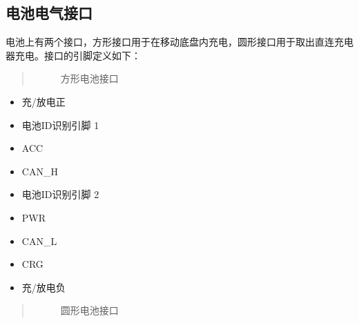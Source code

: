 \documentclass[a4paper,11pt,english,openany,oneside]{sphinxmanual}
\begin{document}
\subsection{电池电气接口}
\label{\detokenize{08 _u5b89_u88c5_u4e0e_u8c03_u8bd5:id17}}\label{\detokenize{08 _u5b89_u88c5_u4e0e_u8c03_u8bd5:id18}}
\sphinxAtStartPar
电池上有两个接口，方形接口用于在移动底盘内充电，圆形接口用于取出直连充电器充电。接口的引脚定义如下：
\begin{quote}

\begin{figure}[H]
\centering
\capstart

\noindent{}
\caption{方形电池接口}\label{\detokenize{08 _u5b89_u88c5_u4e0e_u8c03_u8bd5:id51}}\end{figure}
\end{quote}
\begin{itemize}
\item {} 
 充/放电正

\item {} 
 电池ID识别引脚 1

\item {} 
 ACC

\item {} 
 CAN\_H

\item {} 
 电池ID识别引脚 2

\item {} 
 PWR

\item {} 
 CAN\_L

\item {} 
 CRG

\item {} 
 充/放电负

\end{itemize}
\begin{quote}

\begin{figure}[H]
\centering
\capstart

\noindent{}
\caption{圆形电池接口}\label{\detokenize{08 _u5b89_u88c5_u4e0e_u8c03_u8bd5:id52}}\end{figure}
\end{quote}
\end{document}
